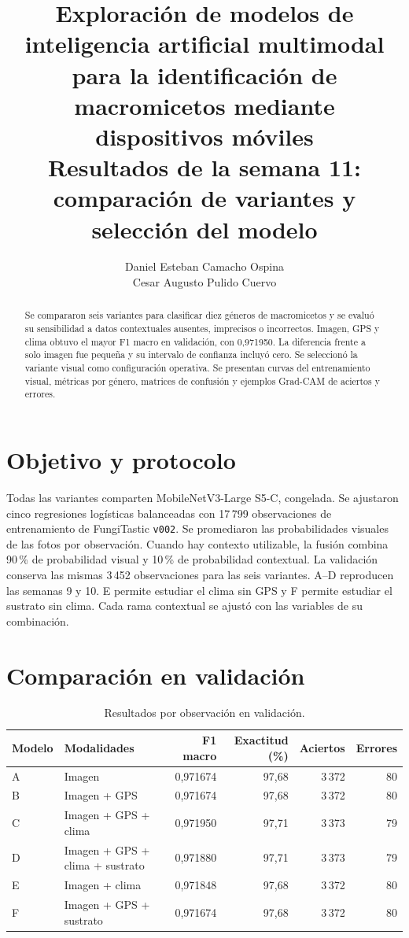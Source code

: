 \documentclass[11pt,a4paper]{article}
\title{\textbf{Exploración de modelos de inteligencia artificial multimodal\\
para la identificación de macromicetos mediante dispositivos móviles}\\[0.6em]
\normalsize Resultados de la semana 11: comparación de variantes y selección del modelo}
\author{Daniel Esteban Camacho Ospina\\Cesar Augusto Pulido Cuervo}
\date{}
\begin{document}
\maketitle

\begin{abstract}
Se compararon seis variantes para clasificar diez géneros de macromicetos y se
evaluó su sensibilidad a datos contextuales ausentes, imprecisos o incorrectos.
Imagen, GPS y clima obtuvo el mayor F1 macro en validación, con 0,971950.
La diferencia frente a solo imagen fue pequeña y su intervalo de confianza
incluyó cero. Se seleccionó la variante visual como configuración operativa.
Se presentan curvas del entrenamiento visual, métricas por género, matrices
de confusión y ejemplos Grad-CAM de aciertos y errores.
\end{abstract}

\section{Objetivo y protocolo}
Todas las variantes comparten MobileNetV3-Large S5-C, congelada. Se ajustaron
cinco regresiones logísticas balanceadas con 17\,799 observaciones de
entrenamiento de FungiTastic \texttt{v002}. Se promediaron las probabilidades
visuales de las fotos por observación. Cuando hay contexto utilizable, la
fusión combina 90\,\% de probabilidad visual y 10\,\% de probabilidad contextual.
La validación conserva las mismas 3\,452 observaciones para las seis variantes.
A--D reproducen las semanas 9 y 10. E permite estudiar el clima sin GPS y F
permite estudiar el sustrato sin clima. Cada rama contextual se ajustó con las
variables de su combinación.

\section{Comparación en validación}
\begin{table}[H]
\centering
\caption{Resultados por observación en validación.}
\label{tab:val}
\begin{tabularx}{\linewidth}{lYrrrr}
\toprule
Modelo & Modalidades & F1 macro & Exactitud (\%) & Aciertos & Errores \\
\midrule
A & Imagen & 0,971674 & 97,68 & 3\,372 & 80 \\
B & Imagen + GPS & 0,971674 & 97,68 & 3\,372 & 80 \\
C & Imagen + GPS + clima & 0,971950 & 97,71 & 3\,373 & 79 \\
D & Imagen + GPS + clima + sustrato & 0,971880 & 97,71 & 3\,373 & 79 \\
E & Imagen + clima & 0,971848 & 97,68 & 3\,372 & 80 \\
F & Imagen + GPS + sustrato & 0,971674 & 97,68 & 3\,372 & 80 \\
\bottomrule
\end{tabularx}
\end{table}
\end{document}
